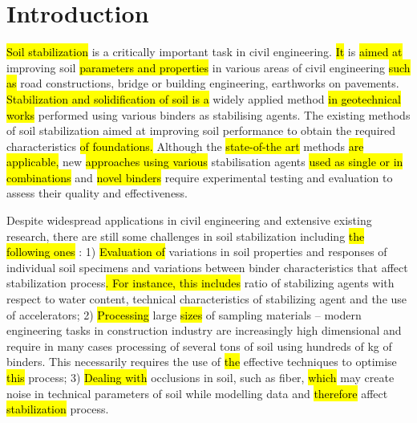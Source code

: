 \documentclass[eprint,
]{actapoly}
\begin{document}

\maketitle

\section{Introduction}

\hl{Soil stabilization} is a critically important task in civil engineering. \hl{It }is \hl{aimed at} improving soil \hl{parameters and properties }in various areas of civil engineering \hl{such as} road constructions, bridge or building engineering, earthworks on pavements. \hl{Stabilization and solidification of soil is a }widely applied method\hl{ in geotechnical works }performed using various binders as stabilising agents. The existing methods of soil stabilization aimed at improving soil performance to obtain the required characteristics \hl{of foundations. }Although the \hl{state-of-the art }methods \hl{are applicable, }new \hl{approaches using various }stabilisation agents \hl{used as single  or in combinations }and \hl{novel binders }require experimental testing and evaluation to assess their quality and effectiveness. 

Despite\hl{ }widespread applications in civil engineering and extensive existing research, there are still some challenges in soil stabilization including\hl{ the following ones }: 1) \hl{Evaluation of }variations in soil properties and responses of individual soil specimens and\hl{ }variations between binder characteristics that affect stabilization process\hl{. For instance, this includes }ratio of stabilizing agents with respect to water content, technical characteristics of stabilizing agent and the use of accelerators; 2) \hl{Processing }large \hl{sizes }of sampling materials – modern engineering tasks in construction industry are increasingly high dimensional and require in many cases processing of several tons of soil using hundreds of kg of binders. This necessarily requires the use of \hl{the }effective techniques to optimise \hl{this }process; 3) \hl{Dealing with }occlusions in soil, such as fiber, \hl{which }may create\hl{ }noise in technical parameters of soil while modelling data and \hl{therefore }affect \hl{stabilization }process. 
\end{document}
